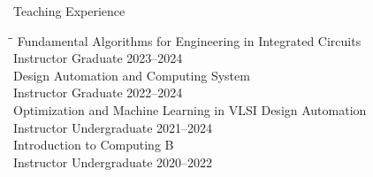 \begin{rSection}{Teaching Experience}

\begin{tabbing}
\hspace{3.5in}\= \hspace{2.5in}\= \kill
Fundamental Algorithms for Engineering in Integrated Circuits  \\
  Instructor \> Graduate \> \hfill {2023--2024} \\
Design Automation and Computing System \\
  Instructor \> Graduate \> \hfill {2022--2024} \\
Optimization and Machine Learning in VLSI Design Automation \\
  Instructor \> Undergraduate \> \hfill {2021--2024} \\
Introduction to Computing B \\
  Instructor \> Undergraduate \> \hfill {2020--2022} \\
\end{tabbing}

\end{rSection}
